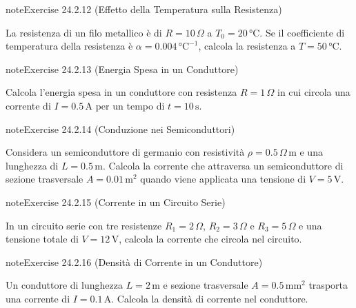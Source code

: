 \documentclass[letterpaper,10pt,italian]{jupyterBook}
\begin{document}
\begin{sphinxadmonition}{note}{Exercise 24.2.12 (Effetto della Temperatura sulla Resistenza)}



\sphinxAtStartPar
La resistenza di un filo metallico è di \(R = 10 \, \Omega\) a \(T_0 = 20 \, \text{°C}\). Se il coefficiente di temperatura della resistenza è \(\alpha = 0.004 \, \text{°C}^{-1}\), calcola la resistenza a \(T = 50 \, \text{°C}\).
\end{sphinxadmonition}
 \label{exercise:ch/electromagnetism/electric-current-problems-exercise-12}

\begin{sphinxadmonition}{note}{Exercise 24.2.13 (Energia Spesa in un Conduttore)}



\sphinxAtStartPar
Calcola l’energia spesa in un conduttore con resistenza \(R = 1 \, \Omega\) in cui circola una corrente di \(I = 0.5 \, \text{A}\) per un tempo di \(t = 10 \, \text{s}\).
\end{sphinxadmonition}
 \label{exercise:ch/electromagnetism/electric-current-problems-exercise-13}

\begin{sphinxadmonition}{note}{Exercise 24.2.14 (Conduzione nei Semiconduttori)}



\sphinxAtStartPar
Considera un semiconduttore di germanio con resistività \(\rho = 0.5 \, \Omega \, \text{m}\) e una lunghezza di \(L = 0.5 \, \text{m}\). Calcola la corrente che attraversa un semiconduttore di sezione trasversale \(A = 0.01 \, \text{m}^2\) quando viene applicata una tensione di \(V = 5 \, \text{V}\).
\end{sphinxadmonition}
 \label{exercise:ch/electromagnetism/electric-current-problems-exercise-14}

\begin{sphinxadmonition}{note}{Exercise 24.2.15 (Corrente in un Circuito Serie)}



\sphinxAtStartPar
In un circuito serie con tre resistenze \(R_1 = 2 \, \Omega\), \(R_2 = 3 \, \Omega\) e \(R_3 = 5 \, \Omega\) e una tensione totale di \(V = 12 \, \text{V}\), calcola la corrente che circola nel circuito.
\end{sphinxadmonition}
 \label{exercise:ch/electromagnetism/electric-current-problems-exercise-15}

\begin{sphinxadmonition}{note}{Exercise 24.2.16 (Densità di Corrente in un Conduttore)}



\sphinxAtStartPar
Un conduttore di lunghezza \(L = 2 \, \text{m}\) e sezione trasversale \(A = 0.5 \, \text{mm}^2\) trasporta una corrente di \(I = 0.1 \, \text{A}\). Calcola la densità di corrente nel conduttore.
\end{sphinxadmonition}
 \label{exercise:ch/electromagnetism/electric-current-problems-exercise-16}
\end{document}
